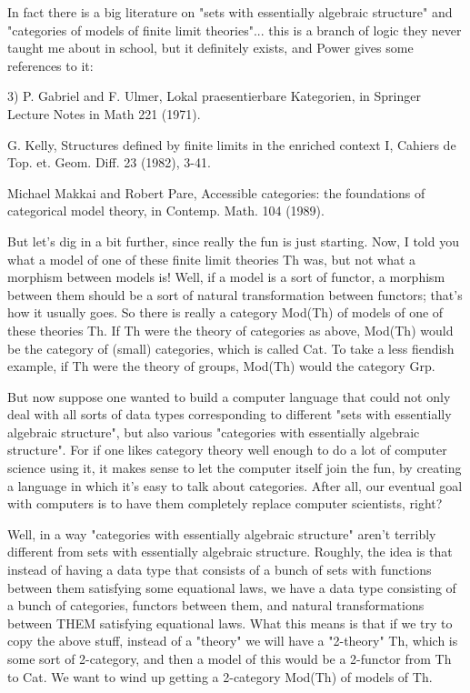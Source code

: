 In fact there is a big literature on "sets with essentially
algebraic structure" and "categories of models of finite limit
theories"... this is a branch of logic they never taught me about 
in school, but it definitely exists, and Power gives some references
to it:

3) P. Gabriel and F. Ulmer, Lokal praesentierbare Kategorien, in
Springer Lecture Notes in Math 221 (1971).

G. Kelly, Structures defined by finite limits in the enriched
context I, Cahiers de Top. et. Geom. Diff. 23 (1982), 3-41.

Michael Makkai and Robert Pare, Accessible categories: the foundations
of categorical model theory, in Contemp. Math. 104 (1989).


But let's dig in a bit further, since really the fun is just 
starting.  Now, I told you what a model of one of these finite
limit theories Th was, but not what a morphism between models
is!  Well, if a model is a sort of functor, a morphism between
them should be a sort of natural transformation between functors; 
that's how it usually goes.  So there is really a category
Mod(Th) of models of one of these theories Th.  If Th were the
theory of categories as above, Mod(Th) would be the category of 
(small) categories, which is called Cat.  To take a less fiendish 
example, if Th were the theory of groups, Mod(Th) would the category 
Grp.

But now suppose one wanted to build a computer language that could
not only deal with all sorts of data types corresponding to different
"sets with essentially algebraic structure", but also various 
"categories with essentially algebraic structure".  For if
one likes category theory well enough to do a lot of computer
science using it, it makes sense to let the computer itself
join the fun, by creating a language in which it's easy to 
talk about categories.  After all, our eventual goal with computers 
is to have them completely replace computer scientists, right?  

Well, in a way "categories with essentially algebraic
structure" aren't terribly different from sets with essentially 
algebraic structure.  Roughly, the idea is that instead of having a
data type that consists of a bunch of sets with functions between
them satisfying some equational laws, we have a data type consisting
of a bunch of categories, functors between them, and natural
transformations between THEM satisfying equational laws.  
What this means is that if we try to copy the above
stuff, instead of a "theory" we will have a "2-theory" Th, which
is some sort of 2-category, and then a model of this would be
a 2-functor from Th to Cat.  We want to wind up getting a 2-category
Mod(Th) of models of Th.   


